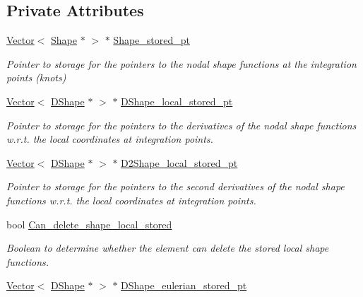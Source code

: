 \subsection*{Private Attributes}
\begin{DoxyCompactItemize}
\item 
\hyperlink{classoomph_1_1Vector}{Vector}$<$ \hyperlink{classoomph_1_1Shape}{Shape} $\ast$ $>$ $\ast$ \hyperlink{classoomph_1_1StorableShapeElementBase_a734b0aa356ab7d0796e6d70e46364d03}{Shape\+\_\+stored\+\_\+pt}
\begin{DoxyCompactList}\small\item\em Pointer to storage for the pointers to the nodal shape functions at the integration points (knots) \end{DoxyCompactList}\item 
\hyperlink{classoomph_1_1Vector}{Vector}$<$ \hyperlink{classoomph_1_1DShape}{D\+Shape} $\ast$ $>$ $\ast$ \hyperlink{classoomph_1_1StorableShapeElementBase_a326e9bbeb61f01660f4acf720d95da8a}{D\+Shape\+\_\+local\+\_\+stored\+\_\+pt}
\begin{DoxyCompactList}\small\item\em Pointer to storage for the pointers to the derivatives of the nodal shape functions w.\+r.\+t. the local coordinates at integration points. \end{DoxyCompactList}\item 
\hyperlink{classoomph_1_1Vector}{Vector}$<$ \hyperlink{classoomph_1_1DShape}{D\+Shape} $\ast$ $>$ $\ast$ \hyperlink{classoomph_1_1StorableShapeElementBase_a394af13fdd8588c660171e40044e6c48}{D2\+Shape\+\_\+local\+\_\+stored\+\_\+pt}
\begin{DoxyCompactList}\small\item\em Pointer to storage for the pointers to the second derivatives of the nodal shape functions w.\+r.\+t. the local coordinates at integration points. \end{DoxyCompactList}\item 
bool \hyperlink{classoomph_1_1StorableShapeElementBase_ad259ffc62869062699aa4e2050447522}{Can\+\_\+delete\+\_\+shape\+\_\+local\+\_\+stored}
\begin{DoxyCompactList}\small\item\em Boolean to determine whether the element can delete the stored local shape functions. \end{DoxyCompactList}\item 
\hyperlink{classoomph_1_1Vector}{Vector}$<$ \hyperlink{classoomph_1_1DShape}{D\+Shape} $\ast$ $>$ $\ast$ \hyperlink{classoomph_1_1StorableShapeElementBase_adf09f33c95feea7f69a764b2311f8d76}{D\+Shape\+\_\+eulerian\+\_\+stored\+\_\+pt}

\end{DoxyCompactItemize}
